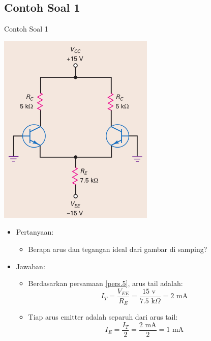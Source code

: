 \documentclass[aspectratio=169]{beamer}
\begin{document}
\subsection{Contoh Soal 1}
\begin{frame}{Contoh Soal 1}
	\begin{multicols}{2}
		\begin{center}
			\includegraphics[width=0.6\textheight]{gambar/01.latihan_soal_1a}
		\end{center}
		\columnbreak
		\begin{itemize}
			\item Pertanyaan:
			\begin{itemize}
				\item Berapa arus dan tegangan ideal dari gambar di samping?
			\end{itemize}
			\item Jawaban:
			\begin{itemize}
				\item Berdasarkan persamaan \ref{pers.5}, arus tail adalah:
				\[I_T = \frac{V_{EE}}{R_E} = \frac{15 \text{ v }}{7.5 \text{ k}\Omega} = 2 \text{ mA} \]
				\item Tiap arus emitter adalah separuh dari arus tail:
				\[ I_E = \frac{I_T}{2} = \frac{2 \text{ mA}}{2} = 1 \text{ mA} \]
			\end{itemize}
		\end{itemize}
		\vfill\null
	\end{multicols}
\end{frame}
\end{document}

